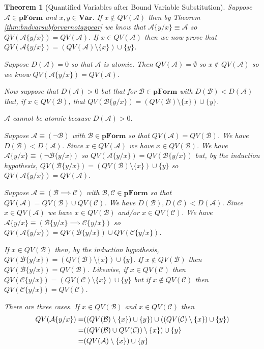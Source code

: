 \documentclass[12pt]{article}
\theoremstyle{break}
\theoremstyle{break}
\newtheorem{theorem}{Theorem}[section]
\theoremstyle{break}
\theoremstyle{break}
\theoremstyle{break}
\newtheorem{informal definition}[definition]{Informal Definition}
\newcommand{\mc}[1]{\mathcal{#1}}
\begin{document}
\begin{theorem}[Quantified Variables after Bound Variable Substitution]
\label{thm:qvafterqvsub}
Suppose $\mc{A}\in\textbf{pForm}$ and $x, y\in\textbf{Var}$.
If $x\not \in QV(\mc{A})$ then by Theorem \ref{thm:bndvarsubforvarnotappear} we know that $\mc{A}\{y/x\} \equiv \mc{A}$ so $QV(\mc{A}\{y/x\}) = QV(\mc{A})$. If $x\in QV(\mc{A})$ then we now prove that $QV(\mc{A}\{y/x\}) = (QV(\mc{A})\setminus\{x\})\cup\{y\}$.

Suppose $D(\mc{A}) = 0$ so that $\mc{A}$ is atomic.
Then $QV(\mc{A}) = \emptyset$ so $x\not \in QV(\mc{A})$ so we know $QV(\mc{A}\{y/x\}) = QV(\mc{A})$.

Now suppose that $D(\mc{A}) > 0$ but that for $\mc{B}\in\textbf{pForm}$ with $D(\mc{B}) < D(\mc{A})$ that, if $x\in QV(\mc{B})$, that $QV(\mc{B}\{y/x\}) = (QV(\mc{B})\setminus\{x\})\cup\{y\}$.

$\mc{A}$ cannot be atomic because $D(\mc{A})>0$.

Suppose $\mc{A}\equiv (\lnot \mc{B})$ with $\mc{B}\in\textbf{pForm}$ so that $QV(\mc{A}) = QV(\mc{B})$.
We have $D(\mc{B}) < D(\mc{A})$.
Since $x \in QV(\mc{A})$ we have $x \in QV(\mc{B})$.
We have $\mc{A}\{y/x\} \equiv (\lnot \mc{B}\{y/x\})$ so $QV(\mc{A}\{y/x\}) = QV(\mc{B}\{y/x\})$ but, by the induction hypothesis, $QV(\mc{B}\{y/x\}) = (QV(\mc{B})\setminus \{x\})\cup\{y\}$ so $QV(\mc{A}\{y/x\}) = QV(\mc{A})$.

Suppose $\mc{A}\equiv (\mc{B}\implies \mc{C})$ with $\mc{B}, \mc{C}\in\textbf{pForm}$ so that $QV(\mc{A}) = QV(\mc{B}) \cup QV(\mc{C})$.
We have $D(\mc{B}), D(\mc{C}) < D(\mc{A})$.
Since $x \in QV(\mc{A})$ we have $x \in QV(\mc{B})$ and/or $x \in QV(\mc{C})$.
We have $\mc{A}\{y/x\} \equiv (\mc{B}\{y/x\} \implies \mc{C}\{y/x\})$ so $QV(\mc{A}\{y/x\}) = QV(\mc{B}\{y/x\}) \cup QV(\mc{C}\{y/x\})$.

If $x\in QV(\mc{B})$ then, by the induction hypothesis, $QV(\mc{B}\{y/x\}) = (QV(\mc{B})\setminus\{x\})\cup\{y\}$. If $x\not \in QV(\mc{B})$ then $QV(\mc{B}\{y/x\}) = QV(\mc{B})$.
Likewise, if $x\in QV(\mc{C})$ then $QV(\mc{C}\{y/x\}) = (QV(\mc{C})\setminus\{x\}) \cup \{y\}$ but if $x\not \in QV(\mc{C})$ then $QV(\mc{C}\{y/x\}) = QV(\mc{C})$.

There are three cases.
If $x\in QV(\mc{B})$ and $x\in QV(\mc{C})$ then
\begin{align}
QV(\mc{A}\{y/x\}) =& ((QV(\mc{B})\setminus\{x\})\cup \{y\}) \cup ((QV(\mc{C})\setminus\{x\})\cup \{y\}) \notag\\
=& ((QV(\mc{B}) \cup QV(\mc{C}))\setminus\{x\})\cup\{y\} \notag\\
=& (QV(\mc{A})\setminus\{x\})\cup\{y\} \notag
\end{align}


\end{theorem}
\end{document}
